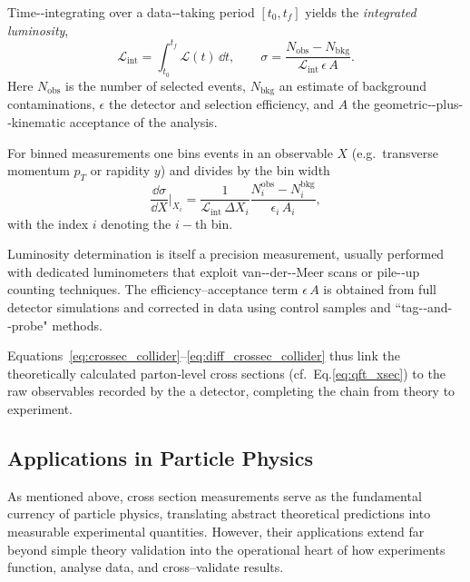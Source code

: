         Time-‑integrating over a data‑-taking period \([t_0, t_f]\) yields the \emph{integrated luminosity},
        \begin{equation}
          \mathcal{L}_{\text{int}}
          = \int_{t_0}^{t_f} \mathcal{L}(t)\,\dd t,
          \qquad
          \sigma
          = \frac{N_{\text{obs}} - N_{\text{bkg}}}
                 {\mathcal{L}_{\text{int}}\,\epsilon\,A}.
          \label{eq:crossec_collider}
        \end{equation}
        Here \(N_{\text{obs}}\) is the number of selected events, \(N_{\text{bkg}}\) an estimate of background contaminations, \(\epsilon\) the detector and selection efficiency, and \(A\) the geometric‑-plus-‑kinematic acceptance of the analysis.

        For binned measurements one bins events in an observable \(X\) (e.g.\ transverse momentum \(p_T\) or rapidity \(y\)) and divides by the bin width
        \begin{equation}
          \frac{\dd\sigma}{\dd X}\Big|_{X_i}
          = \frac{1}{\mathcal{L}_{\text{int}}\,\Delta X_i}
            \frac{N_i^{\text{obs}} - N_i^{\text{bkg}}}
                 {\epsilon_i\,A_i},
          \label{eq:diff_crossec_collider}
        \end{equation}
        with the index \(i\) denoting the \(i-\)th bin.

        Luminosity determination is itself a precision measurement, usually performed with dedicated luminometers that exploit van‑-der-‑Meer
        scans or pile-‑up counting techniques.
        The efficiency–acceptance term \(\epsilon\,A\) is obtained from full detector simulations and corrected in data using control samples and ``tag-‑and-‑probe" methods.

        Equations~\eqref{eq:crossec_collider}–\eqref{eq:diff_crossec_collider} thus link the theoretically calculated parton‑level cross sections (cf.\ Eq.\;\eqref{eq:qft_xsec}) to the raw observables recorded by the a detector, completing the chain from theory to experiment.

    \subsection{Applications in Particle Physics}
        As mentioned above, cross section measurements serve as the fundamental currency of particle physics, translating abstract theoretical predictions into measurable experimental quantities.
        However, their applications extend far beyond simple theory validation into the operational heart of how experiments function, analyse data, and cross--validate results.
